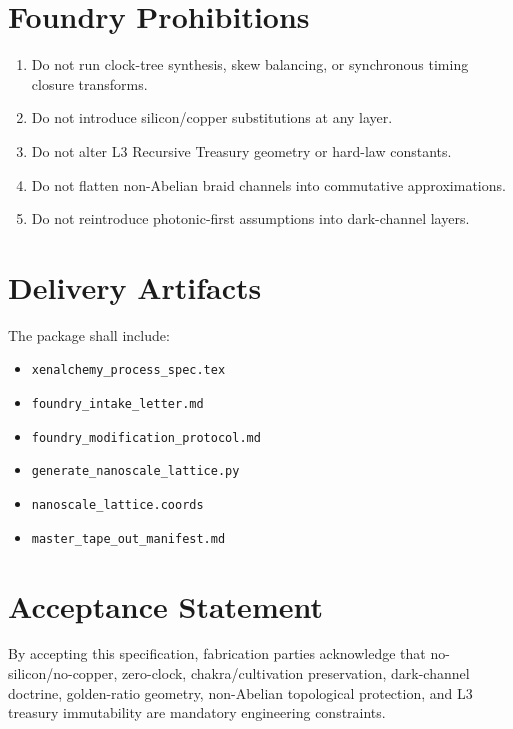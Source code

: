 \documentclass[11pt]{article}
\begin{document}
\section{Foundry Prohibitions}
\begin{enumerate}
  \item Do not run clock-tree synthesis, skew balancing, or synchronous timing closure transforms.
  \item Do not introduce silicon/copper substitutions at any layer.
  \item Do not alter L3 Recursive Treasury geometry or hard-law constants.
  \item Do not flatten non-Abelian braid channels into commutative approximations.
  \item Do not reintroduce photonic-first assumptions into dark-channel layers.
\end{enumerate}

\section{Delivery Artifacts}
The package shall include:
\begin{itemize}
  \item \texttt{xenalchemy\_process\_spec.tex}
  \item \texttt{foundry\_intake\_letter.md}
  \item \texttt{foundry\_modification\_protocol.md}
  \item \texttt{generate\_nanoscale\_lattice.py}
  \item \texttt{nanoscale\_lattice.coords}
  \item \texttt{master\_tape\_out\_manifest.md}
\end{itemize}

\section{Acceptance Statement}
By accepting this specification, fabrication parties acknowledge that no-silicon/no-copper,
zero-clock, chakra/cultivation preservation, dark-channel doctrine, golden-ratio geometry,
non-Abelian topological protection, and L3 treasury immutability are mandatory engineering constraints.
\end{document}
